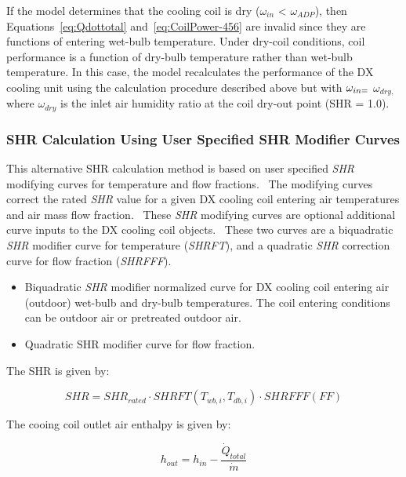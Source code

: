 If the model determines that the cooling coil is dry (\(\omega_{in}\) \textless{} \(\omega_{ADP}\)), then Equations~\ref{eq:Qdottotal} and~\ref{eq:CoilPower-456} are invalid since they are functions of entering wet-bulb temperature. Under dry-coil conditions, coil performance is a function of dry-bulb temperature rather than wet-bulb temperature. In this case, the model recalculates the performance of the DX cooling unit using the calculation procedure described above but with \(\omega_{in\\ =}\) \(\omega_{dry,}\) where \(\omega_{dry}\) is the inlet air humidity ratio at the coil dry-out point (SHR = 1.0).

\subsubsection{SHR Calculation Using User Specified SHR Modifier Curves}\label{shr-calculation-using-user-specified-shr-modifier-curves}

This alternative SHR calculation method is based on user specified \emph{SHR} modifying curves for temperature and flow fractions.~ The modifying curves correct the rated \emph{SHR} value for a given DX cooling coil entering air temperatures and air mass flow fraction.~ These \emph{SHR} modifying curves are optional additional curve inputs to the DX cooling coil objects.~ These two curves are a biquadratic \emph{SHR} modifier curve for temperature (\emph{SHRFT}), and a quadratic \emph{SHR} correction curve for flow fraction (\emph{SHRFFF}).

\begin{itemize}
\item Biquadratic \emph{SHR} modifier normalized curve for DX cooling coil entering air (outdoor) wet-bulb and dry-bulb temperatures. The coil entering conditions can be outdoor air or pretreated outdoor air.
\item Quadratic SHR modifier curve for flow fraction.
\end{itemize}

The SHR is given by:

\begin{equation}
SHR = SH{R_{rated}} \cdot SHRFT\left( {{T_{wb,i}},{T_{db,i}}} \right) \cdot SHRFFF\left( {FF} \right)
\end{equation}

The cooing coil outlet air enthalpy is given by:

\begin{equation}
{h_{out}} = {h_{in}} - \frac{{{{\dot Q}_{total}}}}{{\dot m}}
\end{equation}

